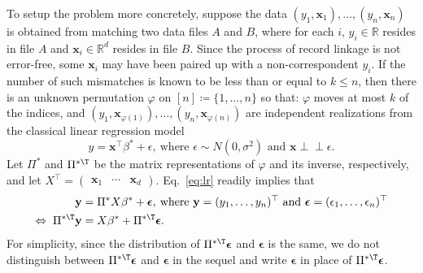 \documentclass[11pt]{article}
\def\R{\mathbb{R}}
\def\x{\mathbf{x}}
\def\y{\mathbf{y}}
\def\eps{\boldsymbol{\epsilon}}
\begin{document}
To setup the problem more concretely, suppose the data $(y_1,\x_1),\ldots, (y_n,\x_n)$ is obtained from matching two data files $A$ and $B$, where for each $i$, $y_i\in\R$ resides in file $A$ and $\x_i\in\R^d$ resides in file $B$. Since the process of record linkage is not error-free, some $\x_i$ may have been paired up with a non-correspondent $y_i$. If the number of such mismatches is known to be less than or equal to $k\le n$, then there is an unknown permutation $\varphi$ on $[n] \coloneq \{1,\ldots,n\}$ so that: $\varphi$ moves at most $k$ of the indices, and $(y_1,\x_{\varphi(1)}),\ldots,(y_n,\x_{\varphi(n)}) $ are independent realizations from the classical linear regression model
\begin{equation}\label{eq:lr}
y=\x^\top\beta^* +\epsilon, \: \text{where $\epsilon\sim N(0,\sigma^2)$ and $\x\perp\!\!\!\perp\epsilon$.}
\end{equation}
Let $\Pi^*$ and $\Pi^{*\T}$ be the matrix representations of $\varphi$ and its inverse, respectively, and let $X^\top=\begin{pmatrix} \x_1&\cdots&\x_d\end{pmatrix}$. Eq.~\eqref{eq:lr} readily implies that 
\begin{align}\label{eq:lrwp}
\begin{split}  
   \y &=\Pi^*X\beta^* +\boldsymbol{\epsilon},\: \text{where $\y=(y_1,\ldots,y_n)^\top$ and $\eps=(\epsilon_1,\ldots,\epsilon_n)^\top$} \\
   \Leftrightarrow \; \Pi^{*\T} \y &= X\beta^* + \Pi^{*\T} \boldsymbol{\epsilon}.
\end{split}
\end{align}
For simplicity, since the distribution of $\Pi^{*\T} \boldsymbol{\epsilon}$ and $\eps$ is the same, we do not distinguish between
$\Pi^{*\T} \boldsymbol{\epsilon}$ and $\eps$ in the sequel and write $\eps$ in place of $\Pi^{*\T} \boldsymbol{\epsilon}$.
\end{document}

